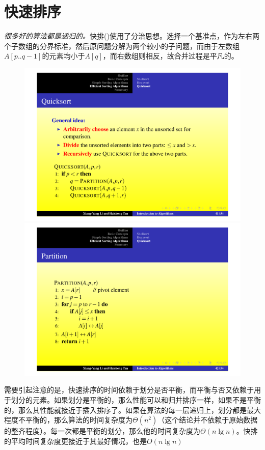 \documentclass[]{report}
\begin{document}
	\section{快速排序}
		\textit{很多好的算法都是递归的。}快排({})使用了分治思想。选择一个基准点，作为左右两个子数组的分界标准，然后原问题分解为两个较小的子问题，而由于左数组$A[p..q-1]$的元素均小于$A[q]$，而右数组则相反，故合并过程是平凡的。
		\begin{figure}[h!]
			\centering
			\begin{minipage}{20em}
				\centering
				\includegraphics[scale = 0.25]{images/QuickSort.pdf}
			\end{minipage}\quad
			\begin{minipage}{20em}
				\centering
				\includegraphics[scale = 0.25]{images/QuickSort_Partition.pdf}
			\end{minipage}
		\end{figure}
		需要引起注意的是，快速排序的时间依赖于划分是否平衡，而平衡与否又依赖于用于划分的元素。如果划分是平衡的，那么性能可以和归并排序一样，如果不是平衡的，那么其性能就接近于插入排序了。如果在算法的每一层递归上，划分都是最大程度不平衡的，那么算法的时间复杂度为$\Theta(n^2)$（这个结论并不依赖于原始数据的整齐程度）。每一次都是平衡的划分，那么他的时间复杂度为$\Theta(n\lg n)$。快排的平均时间复杂度更接近于其最好情况，也是$O(n\lg n)$
\end{document}
